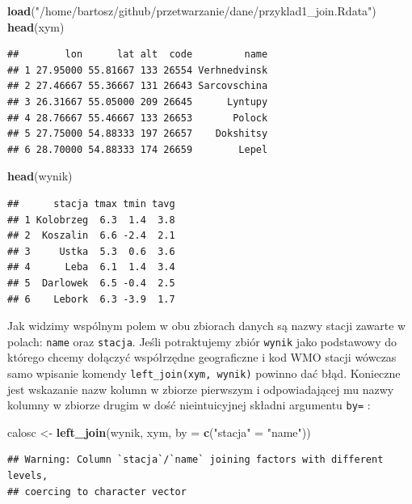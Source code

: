\documentclass[]{book}
\newenvironment{Shaded}{\begin{snugshade}}{\end{snugshade}}
\newcommand{\KeywordTok}[1]{\textcolor[rgb]{0.13,0.29,0.53}{\textbf{#1}}}
\newcommand{\DataTypeTok}[1]{\textcolor[rgb]{0.13,0.29,0.53}{#1}}
\newcommand{\StringTok}[1]{\textcolor[rgb]{0.31,0.60,0.02}{#1}}
\newcommand{\NormalTok}[1]{#1}
\theoremstyle{definition}
\theoremstyle{definition}
\theoremstyle{definition}
\theoremstyle{remark}
\begin{document}
\begin{Shaded}
\begin{Highlighting}[]
\KeywordTok{load}\NormalTok{(}\StringTok{"/home/bartosz/github/przetwarzanie/dane/przyklad1_join.Rdata"}\NormalTok{)}
\KeywordTok{head}\NormalTok{(xym)}
\end{Highlighting}
\end{Shaded}

\begin{verbatim}
##        lon      lat alt  code         name
## 1 27.95000 55.81667 133 26554 Verhnedvinsk
## 2 27.46667 55.36667 131 26643 Sarcovschina
## 3 26.31667 55.05000 209 26645      Lyntupy
## 4 28.76667 55.46667 133 26653       Polock
## 5 27.75000 54.88333 197 26657    Dokshitsy
## 6 28.70000 54.88333 174 26659        Lepel
\end{verbatim}

\begin{Shaded}
\begin{Highlighting}[]
\KeywordTok{head}\NormalTok{(wynik)}
\end{Highlighting}
\end{Shaded}

\begin{verbatim}
##      stacja tmax tmin tavg
## 1 Kolobrzeg  6.3  1.4  3.8
## 2  Koszalin  6.6 -2.4  2.1
## 3     Ustka  5.3  0.6  3.6
## 4      Leba  6.1  1.4  3.4
## 5  Darlowek  6.5 -0.4  2.5
## 6    Lebork  6.3 -3.9  1.7
\end{verbatim}

Jak widzimy wspólnym polem w obu zbiorach danych są nazwy stacji zawarte
w polach: \texttt{name} oraz \texttt{stacja}. Jeśli potraktujemy zbiór
\texttt{wynik} jako podstawowy do którego chcemy dołączyć współrzędne
geograficzne i kod WMO stacji wówczas samo wpisanie komendy
\texttt{left\_join(xym,\ wynik)} powinno dać błąd. Konieczne jest
wskazanie nazw kolumn w zbiorze pierwszym i odpowiadającej mu nazwy
kolumny w zbiorze drugim w dość nieintuicyjnej składni argumentu
\texttt{by=} :

\begin{Shaded}
\begin{Highlighting}[]
\NormalTok{calosc <-}\StringTok{ }\KeywordTok{left_join}\NormalTok{(wynik, xym, }\DataTypeTok{by =} \KeywordTok{c}\NormalTok{(}\StringTok{"stacja"}\NormalTok{ =}\StringTok{ "name"}\NormalTok{))}
\end{Highlighting}
\end{Shaded}

\begin{verbatim}
## Warning: Column `stacja`/`name` joining factors with different levels,
## coercing to character vector
\end{verbatim}
\end{document}
